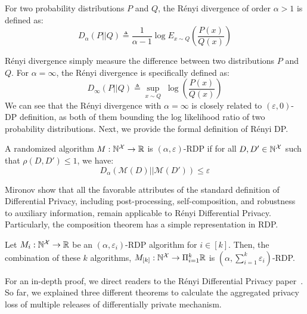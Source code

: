 \begin{definition}
  For two probability distributions $P$ and $Q$, the R\'enyi divergence of order $\alpha > 1$ is defined as:
  \begin{equation*}
    D_{\alpha}(P||Q) \triangleq \frac{1}{\alpha-1} \log E_{x \sim Q}\left ( \frac{P(x)}{Q(x)} \right )
  \end{equation*}
\end{definition}
R\'enyi divergence simply measure the difference between two distributions $P$ and $Q$.
For $\alpha = \infty$, the R\'enyi divergence is specifically defined as:
\begin{equation*}
  D_{\infty}(P||Q) \triangleq  \sup_{x \sim Q} \; \log \left ( \frac{P(x)}{Q(x)} \right ) 
\end{equation*}
We can see that the R\'enyi divergence with $\alpha=\infty$ is closely related to $(\varepsilon, 0)$-DP definition, as both of them bounding the log likelihood ratio of two probability distributions. Next, we provide the formal definition of R\'enyi DP.
\begin{definition}
  A randomized algorithm $M: \mathbb{N}^\mathcal{X} \rightarrow \mathbb{R}$ is $(\alpha, \varepsilon)$-RDP if for all $D, D' \in \mathbb{N}^\mathcal{X}$ such that $\rho(D, D') \leq 1$, we have:
  \begin{equation*}
    D_{\alpha}(\mathcal{M}(D)||\mathcal{M}(D')) \leq \varepsilon
  \end{equation*}
\end{definition}
Mironov show that all the favorable attributes of the standard definition of Differential Privacy, including post-processing, self-composition, and robustness to auxiliary information, remain applicable to R\'enyi Differential  Privacy.
Particularly, the composition theorem has a simple representation in RDP.
\begin{proposition}\label{prop:rdp-composition}
  Let $M_i: \mathbb{N}^\mathcal{X} \rightarrow \mathbb{R}$ be an $(\alpha, \varepsilon_i)$-RDP algorithm for $i \in [k]$. Then, the combination of these $k$ algorithms, $M_{[k]}: \mathbb{N}^\mathcal{X} \rightarrow \Pi_{i=1}^{k}\mathbb{R}$ is $(\alpha, \sum_{i=1}^{k}\varepsilon_i)$-RDP.   
\end{proposition}
\noindent For an in-depth proof, we direct readers to the R\'enyi Differential Privacy paper~\cite{mironov2017renyi}.
So far, we explained three different theorems to calculate the aggregated privacy loss of multiple releases of differentially private mechanism.
